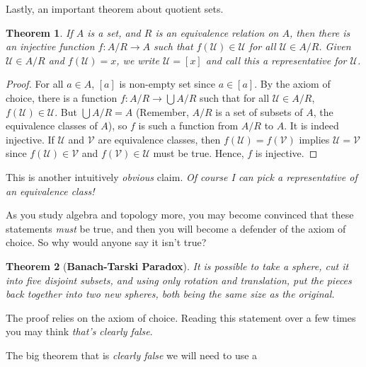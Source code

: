 \documentclass{article}
\theoremstyle{plain}
\newtheorem{theorem}{Theorem}[section]
\theoremstyle{normal}
\begin{document}
        Lastly, an important theorem about quotient sets.
        \begin{theorem}
            If $A$ is a set, and $R$ is an equivalence relation on $A$, then
            there is an injective function $f:A/R\rightarrow{A}$ such that
            $f(\mathcal{U})\in\mathcal{U}$ for all $\mathcal{U}\in{A}/R$. Given
            $\mathcal{U}\in{A}/R$ and $f(\mathcal{U})=x$, we write
            $\mathcal{U}=[x]$ and call this a \textit{representative} for
            $\mathcal{U}$.
        \end{theorem}
        \begin{proof}
            For all $a\in{A}$, $[a]$ is non-empty set since $a\in[a]$. By the
            axiom of choice, there is a function
            $f:A/R\rightarrow\bigcup{A}/R$ such that for all
            $\mathcal{U}\in{A}/R$, $f(\mathcal{U})\in\mathcal{U}$. But
            $\bigcup{A}/R=A$ (Remember, $A/R$ is a set of subsets of $A$, the
            equivalence classes of $A$), so $f$ is such a function from
            $A/R$ to $A$. It is indeed injective. If
            $\mathcal{U}$ and $\mathcal{V}$ are equivalence classes,
            then $f(\mathcal{U})=f(\mathcal{V})$ implies
            $\mathcal{U}=\mathcal{V}$ since
            $f(\mathcal{U})\in\mathcal{V}$ and $f(\mathcal{V})\in\mathcal{U}$
            must be true. Hence, $f$ is injective.
        \end{proof}
        This is another intuitively \textit{obvious} claim.
        \textit{Of course I can pick a representative of an equivalence class!}
        \par\hfill\par
        As you study algebra and topology more, you may become convinced that
        these statements \textit{must} be true, and then you will become a
        defender of the axiom of choice. So why would anyone say it isn't true?
        \begin{theorem}[\textbf{Banach-Tarski Paradox}]
            It is possible to take a sphere, cut it into five disjoint subsets,
            and using only rotation and translation, put the pieces back
            together into two new spheres, both being the same size as the
            original. 
        \end{theorem}
        The proof relies on the axiom of choice. Reading this statement over
        a few times you may think \textit{that's clearly false}.
        \par\hfill\par
        The big theorem that is \textit{clearly false} we will need to use a
\end{document}
